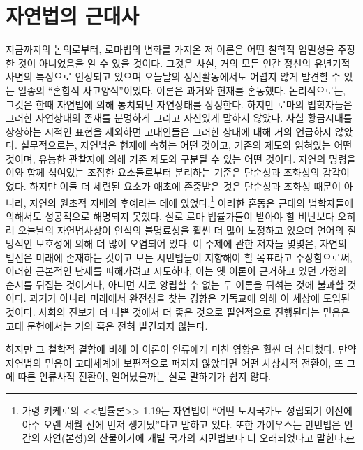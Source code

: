 \chapter{자연법의 근대사}

지금까지의 논의로부터, 로마법의 변화를 가져온 저 이론은 어떤 철학적 엄밀성을
주장한 것이 아니었음을 알 수 있을 것이다.
그것은 사실,
거의 모든 인간 정신의 유년기적 사변의 특징으로 인정되고 있으며
오늘날의 정신활동에서도 어렵지 않게 발견할 수 있는
일종의 ``혼합적 사고양식''이었다.
 이론은 과거와 현재를 혼동했다.
논리적으로는, 그것은 한때 자연법에 의해 통치되던 자연상태를 상정한다.
하지만 로마의 법학자들은 그러한 자연상태의 존재를 분명하게 그리고
자신있게 말하지 않았다. 사실 황금시대를 상상하는 시적인 표현을
제외하면 고대인들은 그러한 상태에 대해 거의 언급하지 않았다.
실무적으로는, 자연법은 현재에 속하는 어떤 것이고,
기존의 제도와 얽혀있는 어떤 것이며, 유능한 관찰자에 의해
기존 제도와 구분될 수 있는 어떤 것이다.
자연의 명령을 이와 함께 섞여있는 조잡한 요소들로부터 분리하는 기준은
단순성과 조화성의 감각이었다.
하지만 이들 더 세련된 요소가 애초에 존중받은 것은
단순성과 조화성 때문이 아니라,
자연의 원초적 지배의 후예라는 데에 있었다.\footnote{%
  가령 키케로의 <<법률론>> 1.19는 자연법이
  ``어떤 도시국가도 성립되기 이전에 아주 오랜 세월 전에 먼저
  생겨났''다고 말하고 있다.
  또한 가이우스는 만민법은 인간의 자연(본성)의 산물이기에
  개별 국가의 시민법보다 더 오래되었다고 말한다.
   }
이러한 혼동은 근대의 법학자들에 의해서도 성공적으로 해명되지 못했다.
실로
로마 법률가들이 받아야 할 비난보다 오히려
오늘날의 자연법사상이 인식의 불명료성을 훨씬 더 많이 노정하고 있으며
언어의 절망적인 모호성에 의해 더 많이 오염되어 있다.
이 주제에 관한 저자들 몇몇은, 자연의 법전은 미래에 존재하는 것이고
모든 시민법들이 지향해야 할 목표라고 주장함으로써,
이러한 근본적인 난제를 피해가려고 시도하나,
이는 옛 이론이 근거하고 있던 가정의 순서를 뒤집는 것이거나,
아니면 서로 양립할 수 없는 두 이론을 뒤섞는 것에 불과할 것이다.
과거가 아니라 미래에서 완전성을 찾는 경향은 기독교에 의해
이 세상에 도입된 것이다.
사회의 진보가 더 나쁜 것에서 더 좋은 것으로 필연적으로 진행된다는 믿음은
고대 문헌에서는 거의 혹은 전혀 발견되지 않는다.

하지만 그 철학적 결함에 비해 이 이론이 인류에게 미친 영향은 훨씬 더 심대했다.
만약 자연법의 믿음이 고대세계에 보편적으로 퍼지지 않았다면
어떤 사상사적 전환이, 또 그에 따른 인류사적 전환이, 일어났을까는
실로 말하기가 쉽지 않다.

